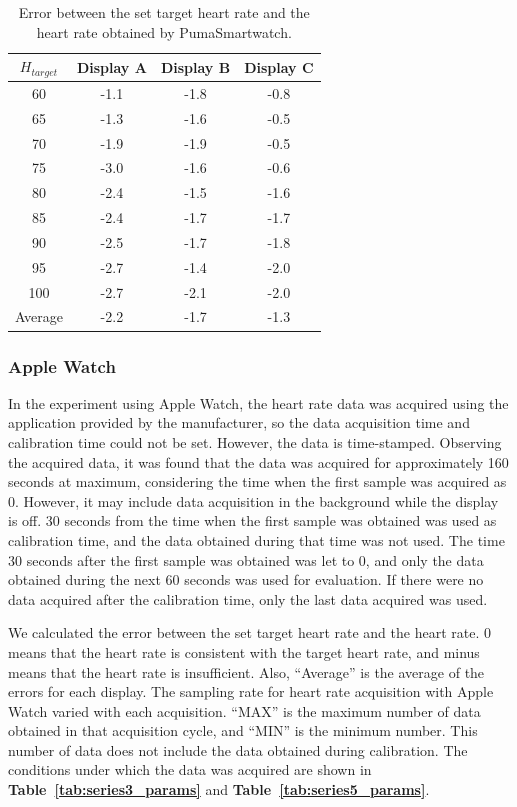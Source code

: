 \documentclass[sigchi,authordraft]{acmart}
\newcommand\tabref[1]{\textbf{Table~\ref{tab:#1}}}
\begin{document}
\begin{table}[!t]
  \centering
  \caption{Error between the set target heart rate and the heart rate obtained by PumaSmartwatch.}
  \begin{tabular}{c|c|c|c} \hline\hline
    $H_{target}$ & Display A & Display B & Display C \\ \hline
    60 & -1.1 & -1.8 & -0.8 \\
    65 & -1.3 & -1.6 & -0.5 \\
    70 & -1.9 & -1.9 & -0.5 \\
    75 & -3.0 & -1.6 & -0.6 \\
    80 & -2.4 & -1.5 & -1.6 \\
    85 & -2.4 & -1.7 & -1.7 \\
    90 & -2.5 & -1.7 & -1.8 \\
    95 & -2.7 & -1.4 & -2.0 \\
    100 & -2.7 & -2.1 & -2.0 \\ \hline
    Average & -2.2 & -1.7 & -1.3 \\ \hline
  \end{tabular}
  \label{tab:puma_result}
\end{table}


\subsubsection{Apple Watch}
In the experiment using Apple Watch, the heart rate data was acquired using the application provided by the manufacturer, so the data acquisition time and calibration time could not be set. However, the data is time-stamped. Observing the acquired data, it was found that the data was acquired for approximately 160 seconds at maximum, considering the time when the first sample was acquired as 0. However, it may include data acquisition in the background while the display is off. 30 seconds from the time when the first sample was obtained was used as calibration time, and the data obtained during that time was not used. The time 30 seconds after the first sample was obtained was let to 0, and only the data obtained during the next 60 seconds was used for evaluation. If there were no data acquired after the calibration time, only the last data acquired was used.\par

We calculated the error between the set target heart rate and the heart rate. 0 means that the heart rate is consistent with the target heart rate, and minus means that the heart rate is insufficient. Also, ``Average'' is the average of the errors for each display. The sampling rate for heart rate acquisition with Apple Watch varied with each acquisition. ``MAX'' is the maximum number of data obtained in that acquisition cycle, and ``MIN'' is the minimum number. This number of data does not include the data obtained during calibration. The conditions under which the data was acquired are shown in \tabref{series3_params} and \tabref{series5_params}.\par
\end{document}
